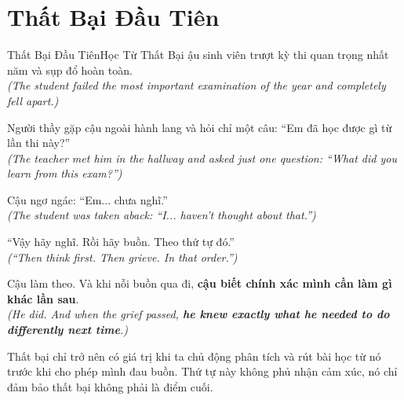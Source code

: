 \section{Thất Bại Đầu Tiên}
\begin{truyen}{Thất Bại Đầu Tiên}{Học Từ Thất Bại}
ậu sinh viên trượt kỳ thi quan trọng nhất năm và sụp đổ hoàn toàn.\\
\textit{(The student failed the most important examination of the year and completely fell apart.)}

Người thầy gặp cậu ngoài hành lang và hỏi chỉ một câu: ``Em đã học được gì từ lần thi này?''\\
\textit{(The teacher met him in the hallway and asked just one question: ``What did you learn from this exam?'')}

Cậu ngơ ngác: ``Em... chưa nghĩ.''\\
\textit{(The student was taken aback: ``I... haven't thought about that.'')}

``Vậy hãy nghĩ. Rồi hãy buồn. Theo thứ tự đó.''\\
\textit{(``Then think first. Then grieve. In that order.'')}

Cậu làm theo. Và khi nỗi buồn qua đi, \textbf{cậu biết chính xác mình cần làm gì khác lần sau}.\\
\textit{(He did. And when the grief passed, \textbf{he knew exactly what he needed to do differently next time}.)}
\end{truyen}
\begin{baihoc}
  Thất bại chỉ trở nên có giá trị khi ta chủ động phân tích và rút bài học từ nó trước khi cho phép mình đau buồn. Thứ tự này không phủ nhận cảm xúc, nó chỉ đảm bảo thất bại không phải là điểm cuối.
\end{baihoc}


